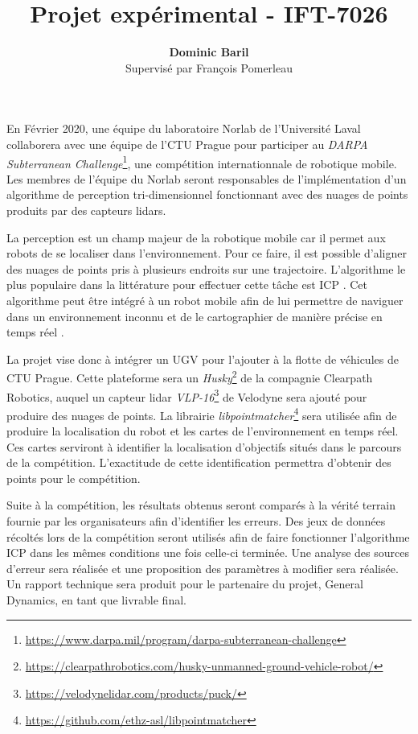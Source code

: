 \documentclass[12pt]{article}
\title{\vspace{-2.0cm} Projet expérimental - IFT-7026}
\author{\textbf{Dominic Baril} \\ \small Supervisé par François Pomerleau}
\date{\vspace{-5ex}}
\begin{document}
    \maketitle
    
     En Février 2020, une équipe du laboratoire Norlab de l'Université Laval collaborera avec une équipe de l'\ac{CTU Prague} pour participer au \textit{DARPA Subterranean Challenge}\footnote{\url{https://www.darpa.mil/program/darpa-subterranean-challenge}}, une compétition internationnale de robotique mobile. 
     Les membres de l'équipe du Norlab seront responsables de l'implémentation d'un algorithme de perception tri-dimensionnel fonctionnant avec des nuages de points produits par des capteurs lidars.
     
     \bigskip
     
     La perception est un champ majeur de la robotique mobile car il permet aux robots de se localiser dans l'environnement.
     Pour ce faire, il est possible d'aligner des nuages de points pris à plusieurs endroits sur une trajectoire. 
     L'algorithme le plus populaire dans la littérature pour effectuer cette tâche est \ac{ICP} \cite{Chen1991}. 
     Cet algorithme peut être intégré à un robot mobile afin de lui permettre de naviguer dans un environnement inconnu et de le cartographier de manière précise en temps réel \cite{Pomerleau2013, Pomerleau2015}. %
     
     \bigskip
     
     La projet vise donc à intégrer un \ac{UGV} pour l'ajouter à la flotte de véhicules de \ac{CTU Prague}. 
     Cette plateforme sera un \textit{Husky}\footnote{\url{https://clearpathrobotics.com/husky-unmanned-ground-vehicle-robot/}} de la compagnie Clearpath Robotics, auquel un capteur lidar \textit{VLP-16}\footnote{\url{https://velodynelidar.com/products/puck/}} de Velodyne sera ajouté pour produire des nuages de points. 
     La librairie \textit{libpointmatcher}\footnote{\url{https://github.com/ethz-asl/libpointmatcher}} sera utilisée afin de produire la localisation du robot et les cartes de l'environnement en temps réel. 
     Ces cartes serviront à identifier la localisation d'objectifs situés dans le parcours de la compétition. 
     L'exactitude de cette identification permettra d'obtenir des points pour le compétition.
     
     \bigskip
     
     Suite à la compétition, les résultats obtenus seront comparés à la vérité terrain fournie par les organisateurs afin d'identifier les erreurs. 
     Des jeux de données récoltés lors de la compétition seront utilisés afin de faire fonctionner l'algorithme \ac{ICP} dans les mêmes conditions une fois celle-ci terminée.
     Une analyse des sources d'erreur sera réalisée et une proposition des paramètres à modifier sera réalisée. 
     Un rapport technique sera produit pour le partenaire du projet, General Dynamics, en tant que livrable final.
     
     \newpage
     \printbibliography[title=Références]
    
\end{document}
